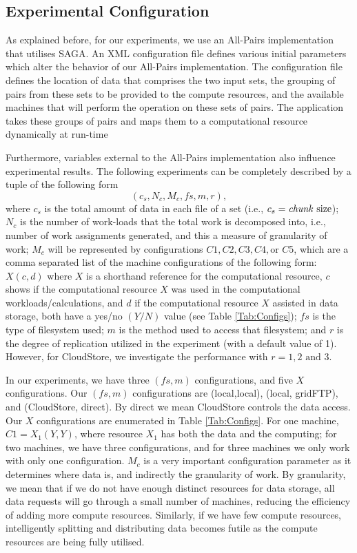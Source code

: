 \documentclass{rspublic}
\begin{document}
\subsection{Experimental Configuration}

As explained before, for our experiments, we use an All-Pairs
implementation that utilises SAGA. An XML configuration file defines
various initial parameters which alter the behavior of our All-Pairs
implementation. The configuration file defines the location of data that
comprises the two input sets, the grouping of pairs from these sets to
be provided to the compute resources, and the available machines that
will perform the operation on these sets of pairs. The application takes
these groups of pairs and maps them to a computational resource
dynamically at run-time 

Furthermore, variables external to the All-Pairs implementation also
influence experimental results. The following experiments can be
completely described by a tuple of the following form
 \begin{equation}
(c_s, N_c, M_c, f\!s, m,r),
\label{Eq:tuple}
\end{equation}
where $c_s$ is the total amount of data in each file of a set (i.e.,
$c_s=\mbox{\textit{chunk} size}$); $N_c$ is the number of work-loads
that the total work is decomposed into, i.e., number of work assignments
generated, and this a measure of granularity of work; $M_c$ will be represented by configurations $C1, C2, C3, C4, \mbox{or } C5$, which are a comma
separated list of the machine configurations of the following form:
$X(c, d)$ where $X$ is a shorthand reference for the computational
resource, $c$ shows if the computational resource $X$ was used in the
computational workloads/calculations, and $d$ if the computational
resource $X$ assisted in data storage, both have a yes/no $(Y/N)$
value (see Table \ref{Tab:Configs}); $f\!s$ is the type of filesystem used; $m$ is the method used to
access that filesystem; and $r$ is the degree of replication utilized in
the experiment (with a default value of 1). However, for CloudStore, we
investigate the performance with $r = 1, 2 \mbox{ and } 3$.

In our experiments, we have three $(f\!s, m)$ configurations, and five $X$
configurations. Our $(f\!s, m)$ configurations are (local,local), (local, gridFTP), and 
(CloudStore, direct). By direct we mean CloudStore controls the data access. Our
$X$ configurations are enumerated in Table \ref{Tab:Configs}. For
one machine, $C1=X_1(Y,Y)$, where resource $X_1$ has both the data and
the computing; for two machines, we have three configurations, and for
three machines we only work with only one configuration. $M_c$ is a very
important configuration parameter as it determines where data is,
and indirectly the granularity of work. By
granularity, we mean that if we do not have enough distinct resources
for data storage, all data requests will go through a small number of
machines, reducing the efficiency of adding more compute resources.
Similarly, if we have few compute resources, intelligently splitting and
distributing data becomes futile as the compute resources are being
fully utilised.
\end{document}
